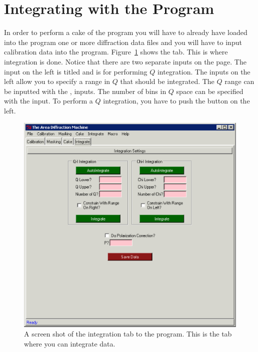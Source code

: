 \section{Integrating with the Program}


In order to perform a cake of the program you will have to 
already have loaded into the program one or more diffraction
data files and you will have to input calibration data
into the program. Figure~\ref{integration_page} shows the
 tab. This is where integration is done.
Notice that there are two separate inputs on the page. 
The input on the left is titled 
and is for performing $Q$ integration.
The inputs on the left allow you to specify a
range in $Q$ that should be integrated.
The $Q$ range can be inputted with the
,  inputs. The number of
bins in $Q$ space can be specified with the
 input. 
To perform a $Q$ integration, you have to push
the  button on the left.

\begin{figure}
\centering
\includegraphics[scale=.75]{figures/integration_page.eps}
\caption{A screen shot of the integration tab to the 
    program. This is the tab where you can integrate data.} 
\label{integration_page}
\end{figure}

